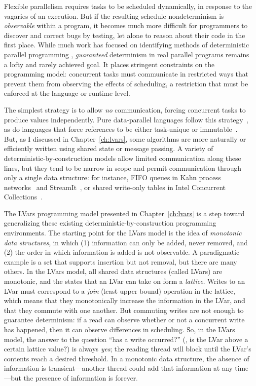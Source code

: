 Flexible parallelism requires tasks to be scheduled dynamically, in
response to the vagaries of an execution.  But if the resulting
schedule nondeterminism is \emph{observable} within a program, it
becomes much more difficult for programmers to discover and correct
bugs by testing, let alone to reason about their code in the first
place.  While much work has focused on identifying methods of
deterministic parallel programming \cite{CnC,
  concurrent-revisions-haskell11, dpj-oopsla,
  Kahn-1974,Lee-sdn,Tesler-1968}, \emph{guaranteed} determinism in
real parallel programs remains a lofty and rarely achieved goal.  It
places stringent constraints on the programming model: concurrent
tasks must communicate in restricted ways that prevent them from
observing the effects of scheduling, a restriction that must be
enforced at the language or runtime level.

The simplest strategy is to allow \emph{no} communication, forcing
concurrent tasks to produce values independently.  Pure data-parallel
languages follow this strategy~\cite{dph}, as do languages that force
references to be either task-unique or immutable~\cite{dpj-oopsla}.
But, as I discussed in Chapter~\ref{ch:lvars}, some algorithms are
more naturally or efficiently written using shared state or message
passing.  A variety of deterministic-by-construction models allow
limited communication along these lines, but they tend to be narrow in
scope and permit communication through only a single data structure:
for instance, FIFO queues in Kahn process networks~\cite{Kahn-1974}
and StreamIt~\cite{streamit-asplos}, or shared write-only tables in
Intel Concurrent Collections~\cite{CnC}.

The LVars programming model presented in Chapter~\ref{ch:lvars} is a
step toward generalizing these existing deterministic-by-construction
programming environments.  The starting point for the LVars model is
the idea of \emph{monotonic data structures}, in which (1) information
can only be added, never removed, and (2) the order in which
information is added is not observable.  A paradigmatic example is a
set that supports insertion but not removal, but there are many
others.  In the LVars model, all shared data structures (called LVars)
are monotonic, and the states that an LVar can take on form a
\emph{lattice}.  Writes to an LVar must correspond to a \emph{join}
(least upper bound) operation in the lattice, which means that they
monotonically increase the information in the LVar, and that they
commute with one another.  But commuting writes are not enough to
guarantee determinism: if a read can observe whether or not a
concurrent write has happened, then it can observe differences in
scheduling.  So, in the LVars model, the answer to the question ``has
a write occurred?'' (\ie, is the LVar above a certain lattice value?)
is always \emph{yes}; the reading thread will block until the LVar's
contents reach a desired threshold.  In a monotonic data structure,
the absence of information is transient---another thread could add
that information at any time---but the presence of information is
forever.

